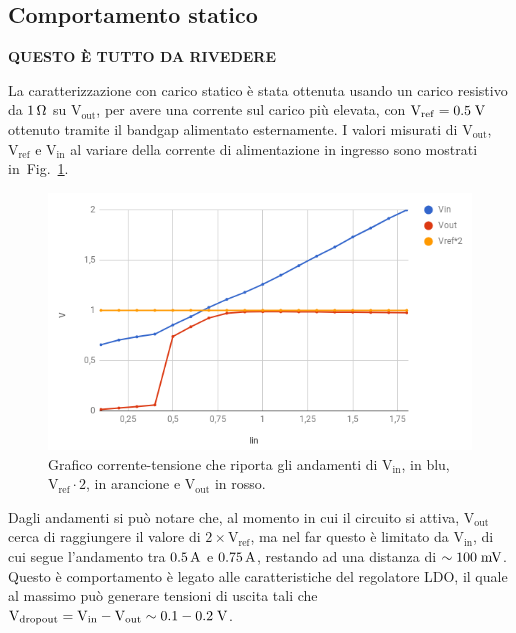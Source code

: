 \subsection{Comportamento statico}

\par \begin{center} {\huge\bf QUESTO \`E TUTTO DA RIVEDERE } \end{center} \par

La caratterizzazione con carico statico è stata ottenuta usando un carico resistivo da $1{\rm \, \Omega}$ su $\mathrm{V_{out}}$, per avere una corrente sul carico pi\`u elevata, con $\mathrm{V_{ref}} = 0.5 \rm \; V$ ottenuto tramite il bandgap alimentato esternamente.
I valori misurati di $\mathrm{V_{out}}$, $\mathrm{V_{ref}}$ e $\mathrm{V_{in}}$ al variare della corrente di alimentazione in ingresso sono mostrati in~Fig.~\ref{SLDO2Astatic}.
\begin{figure}
\centering
\includegraphics[scale=.5]{Immagini/SLDO2Astaticbis}
\caption{Grafico corrente-tensione che riporta gli andamenti di $\mathrm{V_{in}}$, in blu, $\mathrm{V_{ref}\cdot 2}$, in arancione e $\mathrm{V_{out}}$ in rosso.}
\label{SLDO2Astatic}
\end{figure}
Dagli andamenti si può notare che, al momento in cui il circuito si attiva, $\mathrm{V_{out}}$ cerca di raggiungere il valore di $\mathrm{2\times V_{ref}}$, ma nel far questo è limitato da $\mathrm{V_{in}}$, di cui segue l'andamento tra $0.5 \rm \, A$ e $0.75 \rm \, A$, restando ad una distanza di $\sim 100 \rm \; mV$.
Questo è comportamento è legato alle caratteristiche del regolatore LDO, il quale al massimo può generare tensioni di uscita tali che $\mathrm{V_{dropout}=V_{in}-V_{out}\sim 0.1-0.2 \rm \; V}$. 
